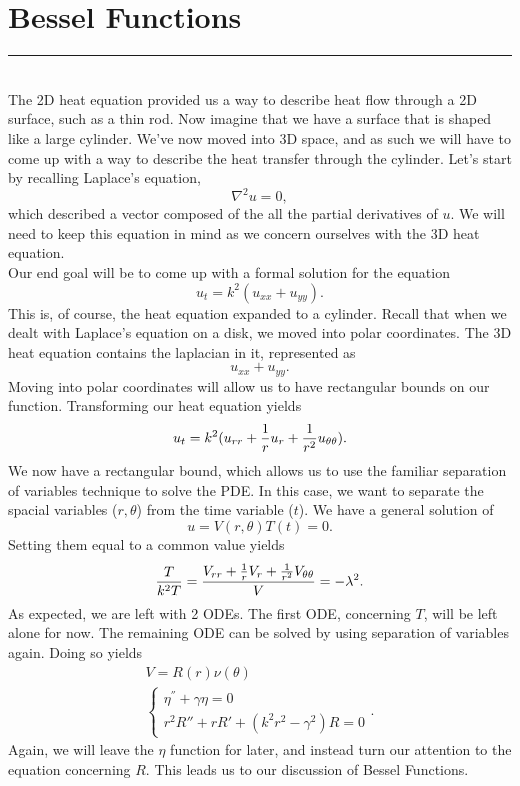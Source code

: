 \section{Bessel Functions}
\hrule
\noindent\\

The 2D heat equation provided us a way to describe heat flow through a 2D surface, such as a thin rod.
Now imagine that we have a surface that is shaped like a large cylinder. We've now moved into 3D space,
and as such we will have to come up with a way to describe the heat transfer through the cylinder. Let's
start by recalling Laplace's equation,
\[
\nabla^{2}u = 0,
\]
which described a vector composed of the all the partial derivatives of $u$. We will need to keep this
equation in mind as we concern ourselves with the 3D heat equation.\\

Our end goal will be to come up with a formal solution for the equation
\[
u_{t} = k^{2}(u_{xx} + u_{yy}).
\]
This is, of course, the heat equation expanded to a cylinder. Recall that when we dealt with Laplace's
equation on a disk, we moved into polar coordinates. The 3D heat equation contains the laplacian in it,
represented as
\[
u_{xx} + u_{yy}.
\]
Moving into polar coordinates will allow us to have rectangular bounds on our function. Transforming our
heat equation yields
\[
u_{t} = k^{2}(u_{rr} + {1 \over r}u_{r} + {1\over r^{2}}u_{\theta\theta}).
\]
We now have a rectangular bound, which allows us to use the familiar separation of variables technique to
solve the PDE. In this case, we want to separate the spacial variables ($r,\theta$) from the time variable
($t$). We have a general solution of
\[
u = V(r,\theta)T(t) = 0.
\]
Setting them equal to a common value yields
\[
{T \over k^{2}T} = {V_{rr} + {1\over r}V_{r} + {1\over r^{2}}V_{\theta\theta} \over V} = -\lambda^{2}.
\]
As expected, we are left with 2 ODEs. The first ODE, concerning $T$, will be left alone for now.
The remaining ODE can be solved by using separation of variables again. Doing so yields
\begin{gather*}
V = R(r)\nu(\theta)\\
\begin{cases}
\eta^{''} + \gamma\eta = 0\\
r^{2}R'' + rR' + (k^{2}r^{2} - \gamma^{2})R = 0
\end{cases}.
\end{gather*}
Again, we will leave the $\eta$ function for later, and instead turn our attention to the equation
concerning $R$. This leads us to our discussion of Bessel Functions.\\
